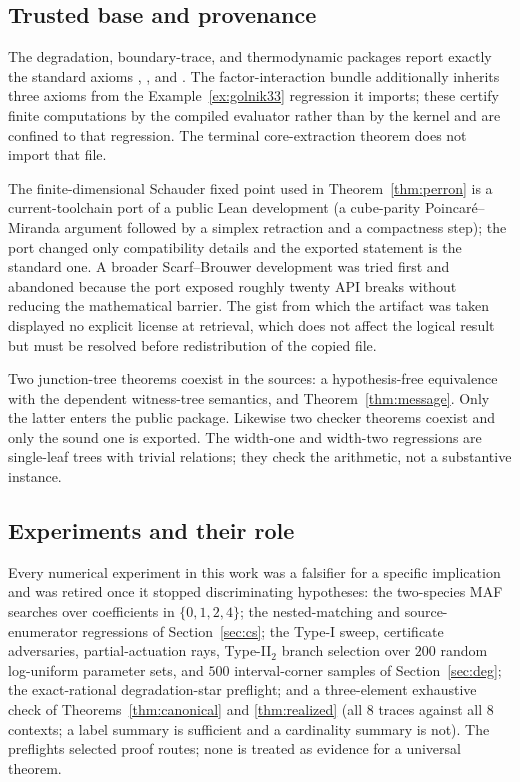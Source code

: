 \documentclass[11pt,a4paper]{article}
\theoremstyle{plain}
\theoremstyle{definition}
\theoremstyle{remark}
\begin{document}
\subsection{Trusted base and provenance}

The degradation, boundary-trace, and thermodynamic packages report exactly the standard axioms , , and . The factor-interaction bundle additionally inherits three  axioms from the Example~\ref{ex:golnik33} regression it imports; these certify finite computations by the compiled evaluator rather than by the kernel and are confined to that regression. The terminal core-extraction theorem does not import that file.

The finite-dimensional Schauder fixed point used in Theorem~\ref{thm:perron} is a current-toolchain port of a public Lean development (a cube-parity Poincaré--Miranda argument followed by a simplex retraction and a compactness step); the port changed only compatibility details and the exported statement is the standard one. A broader Scarf--Brouwer development was tried first and abandoned because the port exposed roughly twenty API breaks without reducing the mathematical barrier. The gist from which the artifact was taken displayed no explicit license at retrieval, which does not affect the logical result but must be resolved before redistribution of the copied file.

Two junction-tree theorems coexist in the sources: a hypothesis-free equivalence with the dependent witness-tree semantics, and Theorem~\ref{thm:message}. Only the latter enters the public package. Likewise two checker theorems coexist and only the sound one is exported. The width-one and width-two regressions are single-leaf trees with trivial relations; they check the arithmetic, not a substantive instance.

\subsection{Experiments and their role}

Every numerical experiment in this work was a falsifier for a specific implication and was retired once it stopped discriminating hypotheses: the two-species MAF searches over coefficients in $\{0,1,2,4\}$; the nested-matching and source-enumerator regressions of Section~\ref{sec:cs}; the Type-I sweep, certificate adversaries, partial-actuation rays, Type-II$_2$ branch selection over $200$ random log-uniform parameter sets, and $500$ interval-corner samples of Section~\ref{sec:deg}; the exact-rational degradation-star preflight; and a three-element exhaustive check of Theorems~\ref{thm:canonical} and \ref{thm:realized} (all $8$ traces against all $8$ contexts; a label summary is sufficient and a cardinality summary is not). The preflights selected proof routes; none is treated as evidence for a universal theorem.
\end{document}
